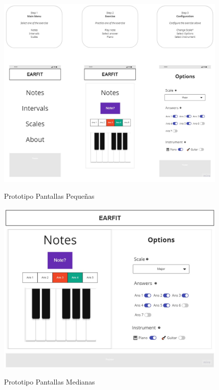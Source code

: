 \documentclass[12pt,twoside,titlepage]{report}
\begin{document}
\begin{figure}[H]
        \centering
        \includegraphics[scale=0.33]{Design Thinking/Prototipo/Small/Prototipo}
        \label{fig:PrototipoSmall}
        \caption{Prototipo Pantallas Pequeñas}
    \end{figure}

    \begin{figure}[H]
        \centering
        \includegraphics[scale=0.3]{Design Thinking/Prototipo/Medium/Notes}
        \label{fig:PrototipoMedium}
        \caption{Prototipo Pantallas Medianas}
    \end{figure}
    
\end{document}
